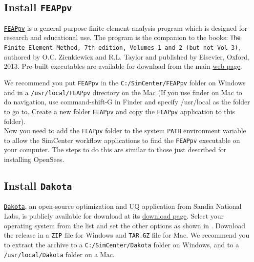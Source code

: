 \subsection{Install \texttt{FEAPpv}}

\href{http://projects.ce.berkeley.edu/feap/feappv/}{\texttt{FEAPpv}} is a general purpose finite element analysis program which is designed for research and educational use. The program is the companion to the books: \texttt{The Finite Element Method, 7th edition, Volumes 1 and 2 (but not Vol 3)}, authored by O.C. Zienkiewicz and R.L. Taylor and published by Elsevier, Oxford, 2013.  Pre-built executables are available for download from the main \href{http://projects.ce.berkeley.edu/feap/feappv/}{web page}.


We recommend you put \texttt{FEAPpv} in
the \texttt{C:/SimCenter/FEAPpv} folder on Windows and in
a \texttt{/usr/local/FEAPpv} directory on the Mac (If you use finder
on Mac to do navigation, use command-shift-G in Finder and specify
/usr/local as the folder to go to. Create a new folder \texttt{FEAPpv}
and copy the \texttt{FEAPpv} application to this folder).\\


Now you need to add the \texttt{FEAPpv} folder to the
system \texttt{PATH} environment variable to allow the SimCenter
workflow applications to find the \texttt{FEAPpv} executable on your
computer. The steps to do this are similar to those just described for installing OpenSees.


\subsection{Install \texttt{Dakota}}

\href{http://dakota.sandia.gov}{\texttt{Dakota}}, an open-source  optimization and UQ application from Sandia National Labs, is publicly available for download at its \href{http://dakota.sandia.gov/download.html}{download page}. Select your operating system from the list and set the other options as shown in  . Download the release in a \texttt{ZIP} file for Windows and \texttt{TAR.GZ} file for Mac. We recommend you to extract the archive to a \texttt{C:/SimCenter/Dakota} folder on Windows, and to a \texttt{/usr/local/Dakota} folder on a Mac.

